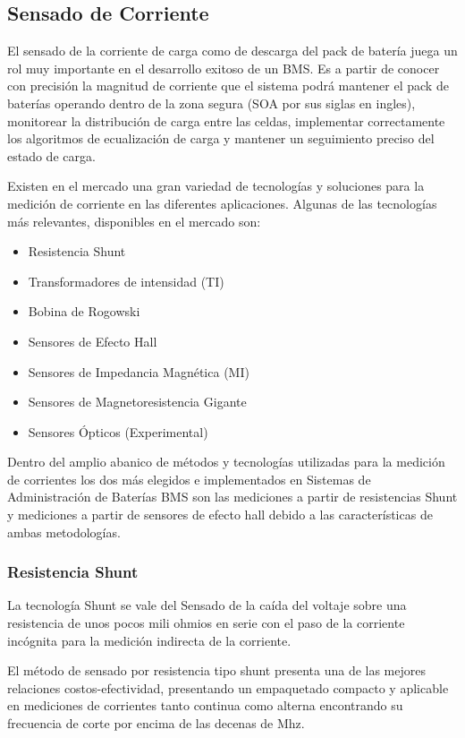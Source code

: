 \documentclass[10pt,a4paper]{article}
\begin{document}
\subsection{Sensado de Corriente}

El sensado de la corriente de carga como de descarga del pack de batería juega
un rol muy importante en el desarrollo exitoso de un \acrshort{BMS}. Es a partir
de conocer con precisión la magnitud de corriente que el sistema podrá mantener
el pack de baterías operando dentro de la zona segura (\acrshort{SOA} por sus
siglas en ingles), monitorear la distribución de carga entre las celdas,
implementar correctamente los algoritmos de ecualización de carga y mantener un
seguimiento preciso del estado de carga.

\noindent Existen en el mercado una gran variedad de tecnologías y 
soluciones para la medición de corriente en las diferentes aplicaciones. 
Algunas de las tecnologías más relevantes, disponibles en el mercado son:
\begin{itemize}
    \item Resistencia Shunt
    \item Transformadores de intensidad (TI)
    \item Bobina de Rogowski 
    \item Sensores de Efecto Hall
    \item Sensores de Impedancia Magnética (MI)
    \item Sensores de Magnetoresistencia Gigante 
    \item Sensores Ópticos (Experimental)
\end{itemize}

Dentro del amplio abanico de métodos y tecnologías utilizadas para la medición
de corrientes los dos más elegidos e implementados en Sistemas de Administración
de Baterías \acrshort{BMS} son las mediciones a partir de resistencias Shunt y
mediciones a partir de sensores de efecto hall debido a las caracter\'isticas de
ambas metodolog\'ias.

\subsubsection{Resistencia Shunt}

La tecnología Shunt se vale del Sensado de la caída del voltaje sobre una
resistencia de unos pocos mili ohmios en serie con el paso de la corriente
incógnita para la medición indirecta de la corriente.

El método de sensado por resistencia tipo shunt presenta una de las mejores
relaciones costos-efectividad, presentando un empaquetado compacto y aplicable
en mediciones de corrientes tanto continua como alterna encontrando su
frecuencia de corte por encima de las decenas de Mhz.
\end{document}
